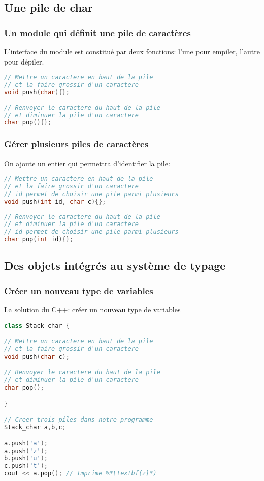 \documentclass{beamer}
\begin{document}
\subsection{Une pile de char}
  
\begin{frame}[fragile=singleslide,shrink=20]
\frametitle {Un module qui définit une pile de caractères}
L'interface du module est constitué par deux fonctions: l'une pour empiler, l'autre pour dépiler.
\begin{lstlisting}[language=c++]
// Mettre un caractere en haut de la pile 
// et la faire grossir d'un caractere
void push(char){};
  
// Renvoyer le caractere du haut de la pile 
// et diminuer la pile d'un caractere
char pop(){};  
\end{lstlisting} 
\end{frame}
  
\begin{frame}[fragile=singleslide,shrink=20]
\frametitle {Gérer plusieurs piles de caractères}
On ajoute un entier qui permettra d'identifier la pile:
\begin{lstlisting}[language=c++]
// Mettre un caractere en haut de la pile 
// et la faire grossir d'un caractere
// id permet de choisir une pile parmi plusieurs
void push(int id, char c){};
  
// Renvoyer le caractere du haut de la pile 
// et diminuer la pile d'un caractere
// id permet de choisir une pile parmi plusieurs
char pop(int id){};  
\end{lstlisting} 
\end{frame}

\subsection{Des objets intégrés au système de typage}

\begin{frame}[fragile=singleslide,shrink=20]
\frametitle {Créer un nouveau type de variables}
La solution du C++: créer un \alert{nouveau type} de variables

\begin{lstlisting}[language=c++]
class Stack_char {

// Mettre un caractere en haut de la pile 
// et la faire grossir d'un caractere
void push(char c);

// Renvoyer le caractere du haut de la pile 
// et diminuer la pile d'un caractere
char pop();

}

// Creer trois piles dans notre programme
Stack_char a,b,c;

a.push('a');
a.push('z');
b.push('u');
c.push('t');
cout << a.pop(); // Imprime %*\textbf{z}*)
\end{lstlisting} 
\end{frame}
  
\end{document}
